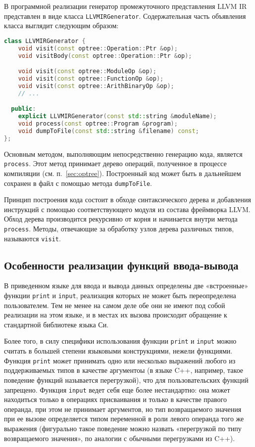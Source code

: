 В программной реализации генератор промежуточного представления LLVM IR представлен в виде класса \verb|LLVMIRGenerator|.
Содержательная часть объявления класса выглядит следующим образом:

\begin{lstlisting}[language=C++, caption=Объявление класса LLVMIRGenerator]
class LLVMIRGenerator {
    void visit(const optree::Operation::Ptr &op);
    void visitBody(const optree::Operation::Ptr &op);

    void visit(const optree::ModuleOp &op);
    void visit(const optree::FunctionOp &op);
    void visit(const optree::ArithBinaryOp &op);
    // ...

  public:
    explicit LLVMIRGenerator(const std::string &moduleName);
    void process(const optree::Program &program);
    void dumpToFile(const std::string &filename) const;
};
\end{lstlisting}

Основным методом, выполняющим непосредственно генерацию кода, является \verb|process|.
Этот метод принимает дерево операций, полученное в процессе компиляции (см. п.~\ref{sec:optree}).
Построенный код может быть в дальнейшем сохранен в файл с помощью метода \verb|dumpToFile|.

Принцип построения кода состоит в обходе синтаксического дерева и добавления инструкций с помощью соответствующего модуля из состава фреймворка LLVM.
Обход дерева производится рекурсивно от корня и начинается внутри метода \verb|process|.
Методы, отвечающие за обработку узлов дерева различных типов, называются \verb|visit|.


\subsection{Особенности реализации функций ввода-вывода}

В приведенном языке для ввода и вывода данных определены две «встроенные» функции \verb|print| и \verb|input|, реализация которых не может быть переопределена пользователем.
Тем не менее на самом деле обе они не имеют под собой реализации на этом языке, и в местах их вызова происходит обращение к стандартной библиотеке языка Си.

Более того, в силу специфики использования функции \verb|print| и \verb|input| можно считать в большей степени языковыми конструкциями, нежели функциями.
Функция \verb|print| может принимать одно или несколько выражений любого из поддерживаемых типов в качестве аргументоы (в языке C++, например, такое поведение функций называется перегрузкой), что для пользовательских функций запрещено.
Функция \verb|input| ведет себя еще более нестандартно: она может находиться только в операциях присваивания и только в качестве правого операнда, при этом не принимает аргументов, но тип возвращаемого значения при ее вызове определяется типом переменной в роли левого операнда того же выражения (фигурально такое поведение можно назвать «перегрузкой по типу возвращаемого значения», по аналогии с обычными перегрузками из C++).

